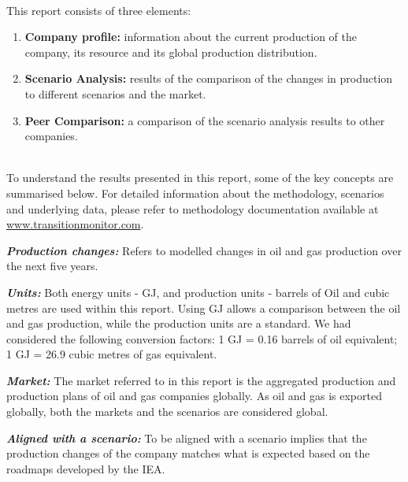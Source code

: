 \documentclass[10pt,table,a4]{article}\usepackage[]{graphicx}\usepackage[]{color}
\newcommand{\Subheader}[1] {\vspace{10pt}{\textbf{\textcolor{Blue1}{\large{#1}}}\vspace{5pt}}}
\begin{document}
			\Subheader{Report Contents}\\	
			This report consists of three elements:
			\vspace{-0.2cm}
			\begin{enumerate}[itemsep=0pt,parsep=2pt,topsep=2pt]
				\item{\textbf{Company profile:} information about the current production of the company, its resource and its global production distribution.} 
				\item{\textbf{Scenario Analysis:} results of the comparison of the changes in production to different scenarios and the market.}
				\item{\textbf{Peer Comparison:} a comparison of the scenario analysis results to other companies.}
			\end{enumerate}
			\vspace{-0.15cm}
			\Subheader{Key Concepts}\\
			To understand the results presented in this report, some of the key concepts are summarised below. For detailed
			information about the methodology, scenarios and underlying data, please refer to methodology documentation available at \href{http://www.transitionmonitor.com/}{www.transitionmonitor.com}.\par
			
			
			\textbf{\emph{Production changes:}} Refers to modelled changes in oil and gas production over the next five years.\par
			
			\textbf{\emph{Units:}} Both energy units - GJ, and production units - barrels of Oil and cubic metres are used within this report. Using GJ allows a comparison between the oil and gas production, while the production units are a standard. We had considered the following conversion factors: 1 GJ = 0.16 barrels of oil equivalent; 1 GJ = 26.9 cubic metres of gas equivalent.\par
			
		
			\textbf{\emph{Market:}} The market referred to in this report is the aggregated production and production plans of oil and gas companies globally. As oil and gas is exported globally, both the markets and the scenarios are considered global. 
			
			\textbf{\emph{Aligned with a scenario:}} To be aligned with a scenario implies that the production changes of the company matches what is expected based on the roadmaps developed by the IEA.\par
			
\end{document}
